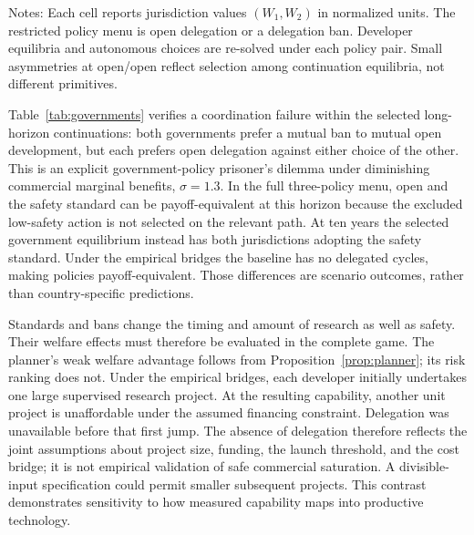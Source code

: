 \begin{table}[htbp]\centering\small
\caption{Government payoffs: selected twenty-five-year continuations}\label{tab:governments}

\begin{minipage}{\textwidth}\footnotesize\vspace{0.4em}
Notes: Each cell reports jurisdiction values $(W_1,W_2)$ in normalized units. The restricted policy menu is open delegation or a delegation ban. Developer equilibria and autonomous choices are re-solved under each policy pair. Small asymmetries at open/open reflect selection among continuation equilibria, not different primitives.
\end{minipage}
\end{table}

Table~\ref{tab:governments} verifies a coordination failure within the selected long-horizon continuations: both governments prefer a mutual ban to mutual open development, but each prefers open delegation against either choice of the other. This is an explicit government-policy prisoner's dilemma under diminishing commercial marginal benefits, $\sigma=1.3$. In the full three-policy menu, open and the safety standard can be payoff-equivalent at this horizon because the excluded low-safety action is not selected on the relevant path. At ten years the selected government equilibrium instead has both jurisdictions adopting the safety standard. Under the empirical bridges the baseline has no delegated cycles, making policies payoff-equivalent. Those differences are scenario outcomes, rather than country-specific predictions.

Standards and bans change the timing and amount of research as well as safety. Their welfare effects must therefore be evaluated in the complete game. The planner's weak welfare advantage follows from Proposition~\ref{prop:planner}; its risk ranking does not. Under the empirical bridges, each developer initially undertakes one large supervised research project. At the resulting capability, another unit project is unaffordable under the assumed financing constraint. Delegation was unavailable before that first jump. The absence of delegation therefore reflects the joint assumptions about project size, funding, the launch threshold, and the cost bridge; it is not empirical validation of safe commercial saturation. A divisible-input specification could permit smaller subsequent projects. This contrast demonstrates sensitivity to how measured capability maps into productive technology.

